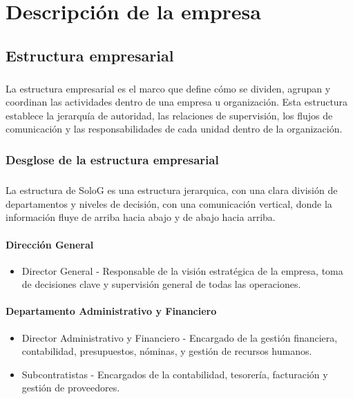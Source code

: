\documentclass{report}
\begin{document}
    \chapter{Descripción de la empresa}
        \section{Estructura empresarial}
          \paragraph*{}{
                La estructura empresarial es el marco que define cómo se dividen, agrupan y coordinan las actividades dentro de una empresa u organización. 
                Esta estructura establece la jerarquía de autoridad, las relaciones de supervisión, los flujos de comunicación y las responsabilidades de cada unidad dentro de la organización.
              }
          \subsection{Desglose de la estructura empresarial}
            \paragraph*{}
            {
              La estructura de SoloG es una estructura jerarquica, con una clara división de departamentos y niveles de decisión, con una comunicación vertical, donde la información fluye de arriba hacia abajo y de abajo hacia arriba.
            }
            \subsubsection*{Dirección General}
              \begin{itemize}
              \item Director General - Responsable de la visión estratégica de la empresa, toma de decisiones clave y supervisión general de todas las operaciones.
              \end{itemize}
            \subsubsection*{Departamento Administrativo y Financiero}
              \begin{itemize}
              \item Director Administrativo y Financiero - Encargado de la gestión financiera, contabilidad, presupuestos, nóminas, y gestión de recursos humanos.
              \item Subcontratistas - Encargados de la contabilidad, tesorería, facturación y gestión de proveedores.
              \end{itemize}
\end{document}
